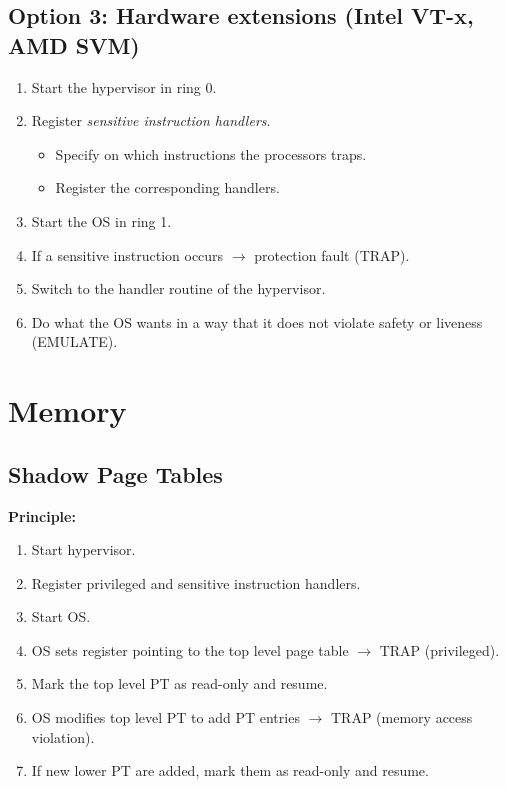 \documentclass[a4paper, 11pt, accentcolor = tud3b]{tudreport}
\begin{document}
	        \subsection{Option 3: Hardware extensions (Intel VT-x, AMD SVM)}
		        \begin{enumerate}
		        	\item Start the hypervisor in ring 0.
		        	\item Register \textit{sensitive instruction handlers}.
			        	\begin{itemize}
			        		\item Specify on which instructions the processors traps.
			        		\item Register the corresponding handlers.
			        	\end{itemize}
		        	\item Start the OS in ring 1.
		        	\item If a sensitive instruction occurs \(\rightarrow\) protection fault (TRAP).
		        	\item Switch to the handler routine of the hypervisor.
		        	\item Do what the OS wants in a way that it does not violate safety or liveness (EMULATE).
		        \end{enumerate}

        \section{Memory}
            \subsection{Shadow Page Tables}
                \textbf{Principle:}
                \begin{enumerate}
                	\item Start hypervisor.
                	\item Register privileged and sensitive instruction handlers.
                	\item Start OS.
                	\item OS sets register pointing to the top level page table \(\rightarrow\) TRAP (privileged).
                	\item Mark the top level PT as read-only and resume.
                	\item OS modifies top level PT to add PT entries \(\rightarrow\) TRAP (memory access violation).
                	\item If new lower PT are added, mark them as read-only and resume.
                \end{enumerate}
            
\end{document}
